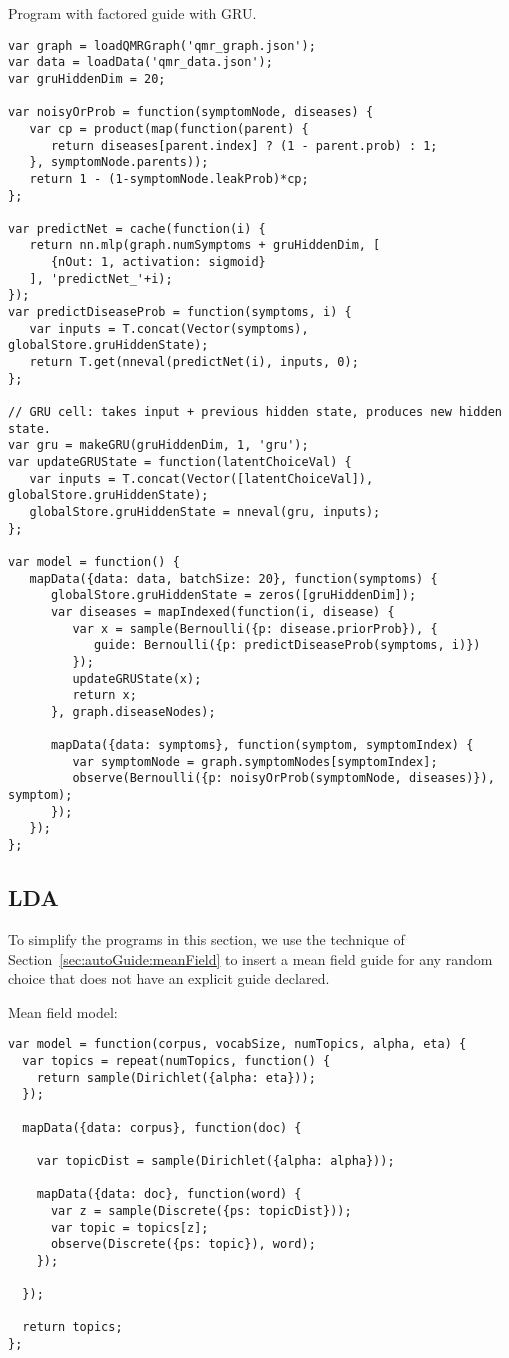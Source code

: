 Program with factored guide with GRU.
\begin{lstlisting}
var graph = loadQMRGraph('qmr_graph.json');
var data = loadData('qmr_data.json');
var gruHiddenDim = 20;

var noisyOrProb = function(symptomNode, diseases) {
   var cp = product(map(function(parent) {
      return diseases[parent.index] ? (1 - parent.prob) : 1;
   }, symptomNode.parents));
   return 1 - (1-symptomNode.leakProb)*cp;
};

var predictNet = cache(function(i) {
   return nn.mlp(graph.numSymptoms + gruHiddenDim, [
      {nOut: 1, activation: sigmoid}
   ], 'predictNet_'+i);
});
var predictDiseaseProb = function(symptoms, i) {
   var inputs = T.concat(Vector(symptoms), globalStore.gruHiddenState);
   return T.get(nneval(predictNet(i), inputs, 0);
};

// GRU cell: takes input + previous hidden state, produces new hidden state.
var gru = makeGRU(gruHiddenDim, 1, 'gru');
var updateGRUState = function(latentChoiceVal) {
   var inputs = T.concat(Vector([latentChoiceVal]), globalStore.gruHiddenState);
   globalStore.gruHiddenState = nneval(gru, inputs);
};

var model = function() {
   mapData({data: data, batchSize: 20}, function(symptoms) {
      globalStore.gruHiddenState = zeros([gruHiddenDim]);
      var diseases = mapIndexed(function(i, disease) {
         var x = sample(Bernoulli({p: disease.priorProb}), {
            guide: Bernoulli({p: predictDiseaseProb(symptoms, i)})
         });
         updateGRUState(x);
         return x;
      }, graph.diseaseNodes);

      mapData({data: symptoms}, function(symptom, symptomIndex) {
         var symptomNode = graph.symptomNodes[symptomIndex];
         observe(Bernoulli({p: noisyOrProb(symptomNode, diseases)}), symptom);
      });
   });
};
\end{lstlisting}

\subsection{LDA}
\label{sec:appendix_code:lda}

To simplify the programs in this section, we use the technique of Section~\ref{sec:autoGuide:meanField} to insert a mean field  guide for any  random choice that does not have an explicit guide declared.

Mean field model:
\begin{lstlisting}
var model = function(corpus, vocabSize, numTopics, alpha, eta) {
  var topics = repeat(numTopics, function() {
    return sample(Dirichlet({alpha: eta}));
  });

  mapData({data: corpus}, function(doc) {

    var topicDist = sample(Dirichlet({alpha: alpha}));

    mapData({data: doc}, function(word) {
      var z = sample(Discrete({ps: topicDist}));
      var topic = topics[z];
      observe(Discrete({ps: topic}), word);
    });

  });

  return topics;
};
\end{lstlisting}

